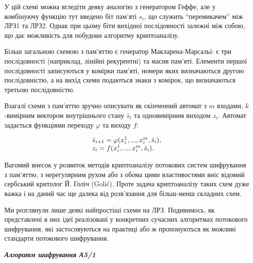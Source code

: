 \documentclass[a4paper]{article}
\newcounter{}
\begin{document}
У цій схемі можна вгледіти деяку аналогію з генератором Геффе, але у комбінуючу
функцію тут введено біт пам’яті  ${s_{{i}}}$, що служить “перемикачем” між ЛРЗ1
та ЛРЗ2. Однак при цьому біти вихідної послідовності залежні між собою, що дає
можливість для побудови алгоритму криптоаналізу.

Більш загальною схемою з пам’яттю є генератор Макларена-Марсальї: є три
послідовності (наприклад, лінійні рекурентні) та масив пам’яті. Елементи першої
послідовності записуються у комірки пам’яті, номери яких визначаються другою
послідовністю, а на вихід схеми подаються знаки з комірок, що визначаються
третьою послідовністю.

Взагалі схеми з пам’яттю зручно описувати як скінченний автомат з  ${m}$
входами,  ${k}${}-вимірним вектором внутрішнього стану  ${{\bar{{s}}}_{{i}}}$
та одновимірним виходом  ${z_{{i}}}$. Автомат задається функціями переходу 
${\varphi }$ та виходу  ${f}$:

\begin{equation*}
\begin{matrix}{{\bar{{s}}}_{{i+1}}=\varphi
(x_{{i}}^{{1}},\text{.}\text{.}\text{.},x_{{i}}^{{m}},{\bar{{s}}}_{{i}}),}\hfill\null
\\z_{{i}}=f(x_{{i}}^{{1}},\text{.}\text{.}\text{.},x_{{i}}^{{m}},{\bar{{s}}}_{{i}})\text{.}\hfill\null
\end{matrix}\hfill 
\end{equation*}

\bigskip

Вагомий внесок у розвиток методів криптоаналізу потокових систем шифрування з
пам’яттю, з нерегулярним рухом або з обома цими властивостями вніс відомий
сербський критолог Й. Голіч (Golić). Проте задача криптоаналізу таких схем дуже
важка і на даний час ще далека від розв’язання для більш-менш складних схем.

Ми розглянули лише деякі найпростіші схеми на ЛРЗ. Подивимось, як представлені в
них ідеї реалізовані у конкретних сучасних алгоритмах потокового шифрування,
які застосовуються на практиці або ж пропонуються як можливі стандарти
потокового шифрування.

{\centering\bfseries\itshape
Алгоритм шифрування А5/1
\par}


\bigskip
\end{document}

